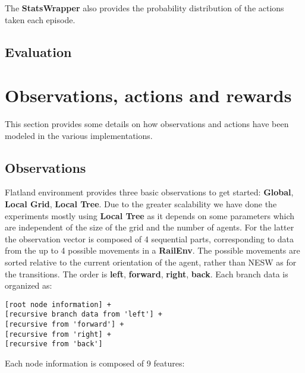 \documentclass[11pt, a4paper, hidelinks]{report}
\begin{document}
The \textbf{StatsWrapper} also provides the probability distribution of the actions taken each episode.

\subsection{Evaluation}

\section{Observations, actions and rewards}\label{sec:observations-and-actions}

This section provides some details on how observations and actions have been modeled in the various implementations.

\subsection{Observations}\label{subsec:observations}

Flatland environment provides three basic observations to get started: \textbf{Global}, \textbf{Local Grid}, \textbf{Local Tree}.
Due to the greater scalability we have done the experiments mostly using \textbf{Local Tree} as it depends on some parameters which are independent of the size of the grid and the number of agents.
For the latter the observation vector is composed of 4 sequential parts, corresponding to data from the up to 4 possible movements in a \textbf{RailEnv}.
The possible movements are sorted relative to the current orientation of the agent, rather than NESW as for the transitions.
The order is \textbf{left}, \textbf{forward}, \textbf{right}, \textbf{back}.
Each branch data is organized as:

\begin{lstlisting}[label={lst:tree-obs}]
[root node information] +
[recursive branch data from 'left'] +
[recursive from 'forward'] +
[recursive from 'right] +
[recursive from 'back']
\end{lstlisting}

Each node information is composed of 9 features:
\end{document}
